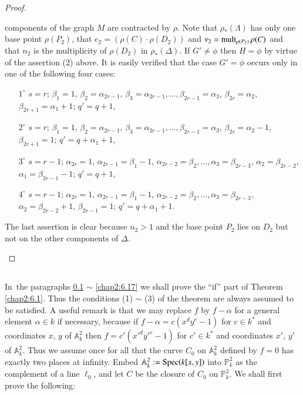 \begin{proof}
\begin{enumerate}
components of the graph $M$ are contracted by $\rho$. Note that
$\rho_{\ast}(\Lambda)$ has only one base point $\rho(P_{2})$, that
$e_{2}=(\rho(C)\cdot\rho(D_{2}))$ and
$\nu_{2}=\operatorname{mult}_{\rho(P_{2})}\rho(C)$ and that $n_{2}$ is the
multiplicity of $\rho(D_{2})$ in $\rho_{\ast}(\Delta)$. If $G'\neq
\phi$ then $H=\phi$ by virtue of the assertion (2) above. It is easily
verified that the case $G'=\phi$ occurs only in one of the following
four cases:
\begin{itemize}
\item[$1^{\circ}$] $s=r$; $\beta_{1}=1$, $\beta_{2}=\alpha_{2r-1}$,
  $\beta_{3}=\alpha_{2r-1},\ldots,\beta_{2r-1}=\alpha_{3}$,
  $\beta_{2r}=\alpha_{2}$, $\beta_{2r+1}=\alpha_{1}+1$; $q'=q+1$,

\item[$2^{\circ}$] $s=r$; $\beta_{1}=1$, $\beta_2= \alpha_{2r-1}$,
  $\beta_{3}=\alpha_{2r-1},\ldots,\beta_{2r-1}=\alpha_{3}$,
  $\beta_{2r}=\alpha_{2}-1$, $\beta_{2r+1}=1$; $q'=q+\alpha_{1}+1$,

\item[$3^{\circ}$] $s=r-1$; $\alpha_{2r}=1$, $\alpha_{2r-1}=\beta_{1}-1$,
  $\alpha_{2r-2}=\beta_{2},\ldots,\alpha_{3}=\beta_{2r-3}$,
  $\alpha_{2}=\beta_{2r-2}$, $\alpha_{1}=\beta_{2r-1}-1$; $q'=q+1$,

\item[$4^{\circ}$] $s=r-1$; $\alpha_{2r}=1$,
  $\alpha_{2r-1}=\beta_{1}-1$,
  $\alpha_{2r-2}=\beta_{2},\ldots,\alpha_{3}=\beta_{2r-3}$,
  $\alpha_{2}=\beta_{2r-2}+1$, $\beta_{2r-1}=1$; $q'=q+\alpha_{1}+1$.
\end{itemize}
The last assertion is clear because $n_{2}>1$ and the base point
$P_{2}$ lies on $D_{2}$ but not on the other components of
$\Delta$.
\end{enumerate}
\end{proof}

\subsection{}\label{chap2:6.7}
In\pageoriginale\ the paragraphs \ref{chap2:6.7} $\sim$ \ref{chap2:6.17} we shall
prove the ``if'' part of Theorem \ref{chap2:6.1}. Thus the conditions (1)
$\sim$ (3) of the theorem are always assumed to be satisfied. A useful
remark is that we may replace $f$ by $f-\alpha$ for a general element
$\alpha\in k$ if necessary, because if $f-\alpha=c(x^{d}y^{e}-1)$ for
$c\in k^{\ast}$ and coordinates $x$, $y$ of $\mathbb{A}^{2}_{k}$ then
$f=c'({x'}^{d}{y'}^{e}-1)$ for $c'\in k^{\ast}$ and coordinates $x'$,
$y'$ of $\mathbb{A}^{2}_{k}$. Thus we assume once for all that the
curve $C_{0}$ on $\mathbb{A}^{2}_{k}$ defined by $f=0$ has exactly two
places at infinity. Embed $\mathbb{A}^{2}_{k}:=\operatorname{Spec}(k[x,y])$ into
$\mathbb{P}^{2}_{k}$ as the complement of a line $\ell_{0}$, and let
$C$ be the closure of $C_{0}$ on $\mathbb{P}^{2}_{k}$. We shall first
prove the following:

